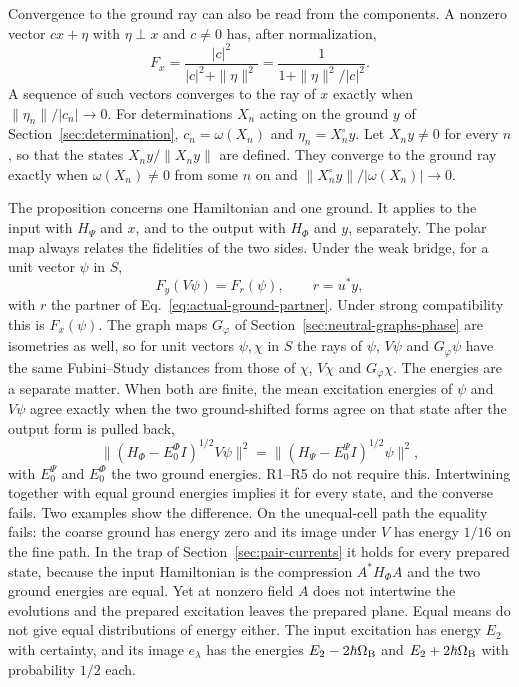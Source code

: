 \documentclass[11pt]{article}
\theoremstyle{definition}
\begin{document}
Convergence to the ground ray can also be read from the components. A nonzero vector $cx+\eta$ with $\eta\perp x$ and $c\ne0$ has, after normalization,
\begin{equation}
 F_x=\frac{|c|^2}{|c|^2+\|\eta\|^2}=\frac1{1+\|\eta\|^2/|c|^2}.
 \label{eq:fidelity-energy-ratio}
\end{equation}
A sequence of such vectors converges to the ray of $x$ exactly when $\|\eta_n\|/|c_n|\to0$. For determinations $X_n$ acting on the ground $y$ of Section~\ref{sec:determination}, $c_n=\omega(X_n)$ and $\eta_n=X_n^\circ y$. Let $X_ny\ne0$ for every $n$, so that the states $X_ny/\|X_ny\|$ are defined. They converge to the ground ray exactly when $\omega(X_n)\ne0$ from some $n$ on and $\|X_n^\circ y\|/|\omega(X_n)|\to0$.

The proposition concerns one Hamiltonian and one ground. It applies to the input with $H_\Psi$ and $x$, and to the output with $H_\Phi$ and $y$, separately. The polar map always relates the fidelities of the two sides. Under the weak bridge, for a unit vector $\psi$ in $S$,
\begin{equation}
 F_y(V\psi)=F_r(\psi),\qquad r=u^*y,
 \label{eq:fidelity-energy-transport}
\end{equation}
with $r$ the partner of Eq.~\eqref{eq:actual-ground-partner}. Under strong compatibility this is $F_x(\psi)$. The graph maps $G_\varphi$ of Section~\ref{sec:neutral-graphs-phase} are isometries as well, so for unit vectors $\psi,\chi$ in $S$ the rays of $\psi$, $V\psi$ and $G_\varphi\psi$ have the same Fubini--Study distances from those of $\chi$, $V\chi$ and $G_\varphi\chi$. The energies are a separate matter. When both are finite, the mean excitation energies of $\psi$ and $V\psi$ agree exactly when the two ground-shifted forms agree on that state after the output form is pulled back,
\begin{equation}
 \bigl\|(H_\Phi-E_0^\Phi I)^{1/2}V\psi\bigr\|^2=\bigl\|(H_\Psi-E_0^\Psi I)^{1/2}\psi\bigr\|^2 ,
 \label{eq:fidelity-energy-forms}
\end{equation}
with $E_0^\Psi$ and $E_0^\Phi$ the two ground energies. R1--R5 do not require this. Intertwining together with equal ground energies implies it for every state, and the converse fails. Two examples show the difference. On the unequal-cell path the equality fails: the coarse ground has energy zero and its image under $V$ has energy $1/16$ on the fine path. In the trap of Section~\ref{sec:pair-currents} it holds for every prepared state, because the input Hamiltonian is the compression $A^*H_\Phi A$ and the two ground energies are equal. Yet at nonzero field $A$ does not intertwine the evolutions and the prepared excitation leaves the prepared plane. Equal means do not give equal distributions of energy either. The input excitation has energy $E_2$ with certainty, and its image $e_\lambda$ has the energies $E_2-2\hbar\Omega_{\rm B}$ and $E_2+2\hbar\Omega_{\rm B}$ with probability $1/2$ each.
\end{document}
